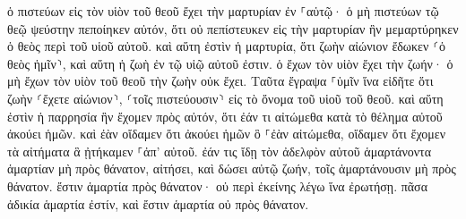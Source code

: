 \documentclass{openreader}
\begin{document}
ὁ πιστεύων εἰς τὸν υἱὸν τοῦ θεοῦ ἔχει τὴν μαρτυρίαν ἐν ⸀αὑτῷ· ὁ μὴ πιστεύων τῷ θεῷ ψεύστην πεποίηκεν αὐτόν, ὅτι οὐ πεπίστευκεν εἰς τὴν μαρτυρίαν ἣν μεμαρτύρηκεν ὁ θεὸς περὶ τοῦ υἱοῦ αὐτοῦ. 
καὶ αὕτη ἐστὶν ἡ μαρτυρία, ὅτι ζωὴν αἰώνιον ἔδωκεν ⸂ὁ θεὸς ἡμῖν⸃, καὶ αὕτη ἡ ζωὴ ἐν τῷ υἱῷ αὐτοῦ ἐστιν. 
ὁ ἔχων τὸν υἱὸν ἔχει τὴν ζωήν· ὁ μὴ ἔχων τὸν υἱὸν τοῦ θεοῦ τὴν ζωὴν οὐκ ἔχει. 
Ταῦτα ἔγραψα ⸀ὑμῖν ἵνα εἰδῆτε ὅτι ζωὴν ⸂ἔχετε αἰώνιον⸃, ⸂τοῖς πιστεύουσιν⸃ εἰς τὸ ὄνομα τοῦ υἱοῦ τοῦ θεοῦ. 
καὶ αὕτη ἐστὶν ἡ παρρησία ἣν ἔχομεν πρὸς αὐτόν, ὅτι ἐάν τι αἰτώμεθα κατὰ τὸ θέλημα αὐτοῦ ἀκούει ἡμῶν. 
καὶ ἐὰν οἴδαμεν ὅτι ἀκούει ἡμῶν ὃ ⸀ἐὰν αἰτώμεθα, οἴδαμεν ὅτι ἔχομεν τὰ αἰτήματα ἃ ᾐτήκαμεν ⸀ἀπ’ αὐτοῦ. 
ἐάν τις ἴδῃ τὸν ἀδελφὸν αὐτοῦ ἁμαρτάνοντα ἁμαρτίαν μὴ πρὸς θάνατον, αἰτήσει, καὶ δώσει αὐτῷ ζωήν, τοῖς ἁμαρτάνουσιν μὴ πρὸς θάνατον. ἔστιν ἁμαρτία πρὸς θάνατον· οὐ περὶ ἐκείνης λέγω ἵνα ἐρωτήσῃ. 
πᾶσα ἀδικία ἁμαρτία ἐστίν, καὶ ἔστιν ἁμαρτία οὐ πρὸς θάνατον. 
\end{document}
